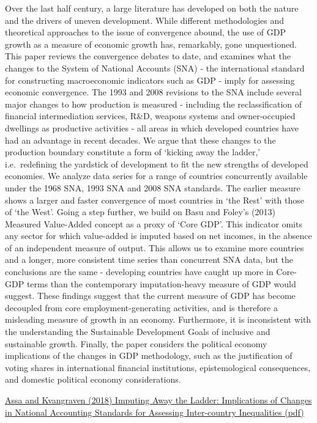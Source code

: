 \documentclass[
]{book}
\begin{document}
Over the last half century, a large literature has developed on both the nature and the drivers of uneven
development. While different methodologies and theoretical approaches to the issue of convergence
abound, the use of GDP growth as a measure of economic growth has, remarkably, gone unquestioned.
This paper reviews the convergence debates to date, and examines what the changes to the System of
National Accounts (SNA) - the international standard for constructing macroeconomic indicators such as
GDP - imply for assessing economic convergence. The 1993 and 2008 revisions to the SNA include
several major changes to how production is measured - including the reclassification of financial
intermediation services, R\&D, weapons systems and owner-occupied dwellings as productive activities -
all areas in which developed countries have had an advantage in recent decades. We argue that these
changes to the production boundary constitute a form of `kicking away the ladder,' i.e.~redefining the
yardstick of development to fit the new strengths of developed economies. We analyze data series for a
range of countries concurrently available under the 1968 SNA, 1993 SNA and 2008 SNA standards. The
earlier measure shows a larger and faster convergence of most countries in `the Rest' with those of `the
West'. Going a step further, we build on Basu and Foley's (2013) Measured Value-Added concept as a
proxy of `Core GDP'. This indicator omits any sector for which value-added is imputed based on net
incomes, in the absence of an independent measure of output. This allows us to examine more countries
and a longer, more consistent time series than concurrent SNA data, but the conclusions are the same -
developing countries have caught up more in Core-GDP terms than the contemporary imputation-heavy
measure of GDP would suggest. These findings suggest that the current measure of GDP has become
decoupled from core employment-generating activities, and is therefore a misleading measure of growth
in an economy. Furthermore, it is inconsistent with the understanding the Sustainable Development Goals
of inclusive and sustainable growth. Finally, the paper considers the political economy implications of the
changes in GDP methodology, such as the justification of voting shares in international financial
institutions, epistemological consequences, and domestic political economy considerations.

\href{pdf/Assa_2021_Imputing_away_the_Ladder.pdf}{Assa and Kvangraven (2018) Imputing Away the Ladder: Implications of Changes in National Accounting Standards for Assessing Inter-country Inequalities (pdf)}
\end{document}
